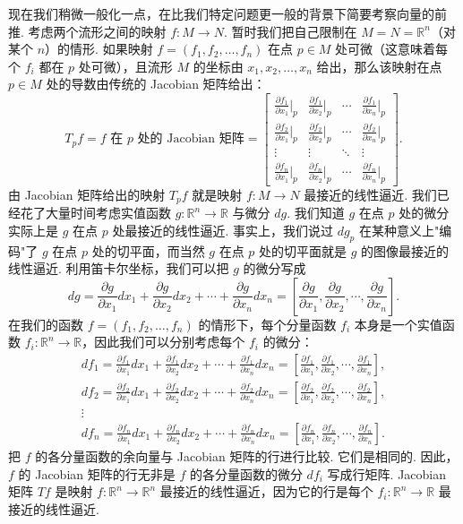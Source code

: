 现在我们稍微一般化一点，在比我们特定问题更一般的背景下简要考察向量的前推. 考虑两个流形之间的映射 $f:M\to N$. 暂时我们把自己限制在 $M=N=\mathbb{R}^n$（对某个 $n$）的情形. 如果映射 $f=(f_1,f_2,\ldots,f_n)$ 在点 $p\in M$ 处可微（这意味着每个 $f_i$ 都在 $p$ 处可微），且流形 $M$ 的坐标由 $x_1,x_2,\ldots,x_n$ 给出，那么该映射在点 $p\in M$ 处的导数由传统的 Jacobian 矩阵给出：
\[
T_pf=\text{$f$ 在 $p$ 处的 Jacobian 矩阵}
=
\begin{bmatrix}
\frac{\partial f_1}{\partial x_1}\Big|_p&\frac{\partial f_1}{\partial x_2}\Big|_p&\cdots&\frac{\partial f_1}{\partial x_n}\Big|_p\\
\frac{\partial f_2}{\partial x_1}\Big|_p&\frac{\partial f_2}{\partial x_2}\Big|_p&\cdots&\frac{\partial f_2}{\partial x_n}\Big|_p\\
\vdots&\vdots&\ddots&\vdots\\
\frac{\partial f_n}{\partial x_1}\Big|_p&\frac{\partial f_n}{\partial x_2}\Big|_p&\cdots&\frac{\partial f_n}{\partial x_n}\Big|_p
\end{bmatrix}.
\]
由 Jacobian 矩阵给出的映射 $T_pf$ 就是映射 $f:M\to N$ 最接近的线性逼近. 我们已经花了大量时间考虑实值函数 $g:\mathbb{R}^n\to\mathbb{R}$ 与微分 $dg$. 我们知道 $g$ 在点 $p$ 处的微分实际上是 $g$ 在点 $p$ 处最接近的线性逼近. 事实上，我们说过 $dg_p$ 在某种意义上"编码"了 $g$ 在点 $p$ 处的切平面，而当然 $g$ 在点 $p$ 处的切平面就是 $g$ 的图像最接近的线性逼近. 利用笛卡尔坐标，我们可以把 $g$ 的微分写成
\[
dg=\frac{\partial g}{\partial x_1}dx_1+\frac{\partial g}{\partial x_2}dx_2+\cdots+\frac{\partial g}{\partial x_n}dx_n
=\left[\frac{\partial g}{\partial x_1},\frac{\partial g}{\partial x_2},\cdots,\frac{\partial g}{\partial x_n}\right].
\]
在我们的函数 $f=(f_1,f_2,\ldots,f_n)$ 的情形下，每个分量函数 $f_i$ 本身是一个实值函数 $f_i:\mathbb{R}^n\to\mathbb{R}$，因此我们可以分别考虑每个 $f_i$ 的微分：
\begin{align*}
df_1=\frac{\partial f_1}{\partial x_1}dx_1+\frac{\partial f_1}{\partial x_2}dx_2+\cdots+\frac{\partial f_1}{\partial x_n}dx_n
=\left[\frac{\partial f_1}{\partial x_1},\frac{\partial f_1}{\partial x_2},\cdots,\frac{\partial f_1}{\partial x_n}\right], \\
df_2=\frac{\partial f_2}{\partial x_1}dx_1+\frac{\partial f_2}{\partial x_2}dx_2+\cdots+\frac{\partial f_2}{\partial x_n}dx_n
=\left[\frac{\partial f_2}{\partial x_1},\frac{\partial f_2}{\partial x_2},\cdots,\frac{\partial f_2}{\partial x_n}\right], \\
\vdots \\
df_n=\frac{\partial f_n}{\partial x_1}dx_1+\frac{\partial f_n}{\partial x_2}dx_2+\cdots+\frac{\partial f_n}{\partial x_n}dx_n
=\left[\frac{\partial f_n}{\partial x_1},\frac{\partial f_n}{\partial x_2},\cdots,\frac{\partial f_n}{\partial x_n}\right].
\end{align*}
把 $f$ 的各分量函数的余向量与 Jacobian 矩阵的行进行比较. 它们是相同的. 因此，$f$ 的 Jacobian 矩阵的行无非是 $f$ 的各分量函数的微分 $df_i$ 写成行矩阵. Jacobian 矩阵 $Tf$ 是映射 $f:\mathbb{R}^n\to\mathbb{R}^n$ 最接近的线性逼近，因为它的行是每个 $f_i:\mathbb{R}^n\to\mathbb{R}$ 最接近的线性逼近.

